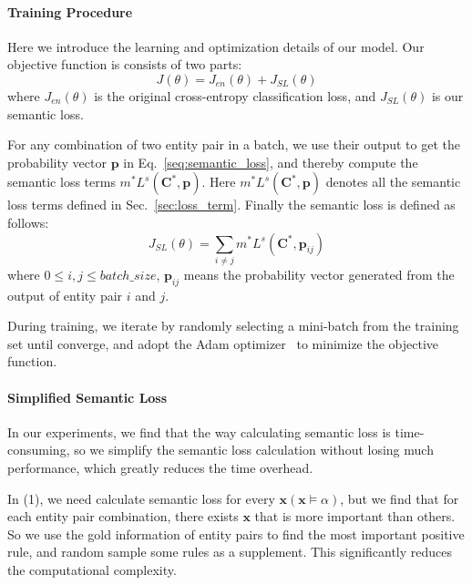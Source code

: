 \paragraph{Training Procedure}
Here we introduce the learning and optimization details of our model. Our objective function is consists of two parts:
\begin{equation}
	J(\theta) = J_{en}(\theta) + J_{SL}(\theta)
\end{equation}
where  $J_{en}(\theta)$ is the original cross-entropy classification loss, and $J_{SL}(\theta)$ is our semantic loss.


For any combination of two entity pair in a batch, we use their \APCNN output to get the probability vector $\bm{p}$ in Eq.~\ref{seq:semantic_loss},
and thereby compute the semantic loss terms $m^{*}L^{s}(\bm{C}^{*}, \bm{p})$.
Here $m^{*}L^{s}(\bm{C}^{*}, \bm{p})$ denotes all the semantic loss terms defined in Sec.~\ref{sec:loss_term}.
Finally the semantic loss is defined as follows:
\begin{equation}
	J_{SL}(\theta) = \sum\limits_{i \neq j}{m^{*}L^{s}(\bm{C}^{*}, \bm{p}_{ij})}
\end{equation}
where $0\leq i, j \leq batch\_size$, $\bm{p}_{ij} $ means the probability vector generated from the \APCNN output of entity pair $i$ and $j$.

During training, we iterate by randomly selecting a mini-batch from the training set until converge, and adopt the Adam optimizer~\cite{kingma2014adam} to minimize the objective function.
\paragraph{Simplified Semantic Loss}

In our experiments, we find that the way \cite{xu2017semantic} calculating semantic loss is time-consuming, so we simplify the semantic loss calculation without losing much performance, which greatly reduces the time overhead.

In (1), we need calculate semantic loss for every $ \bm x (\bm x \models \alpha)$, but we find that for each entity pair combination, there exists $ \bm x $ that is more important than others. So we use the gold information of entity pairs to find the most important positive rule, and random sample some rules as a supplement. This significantly reduces the computational complexity.


